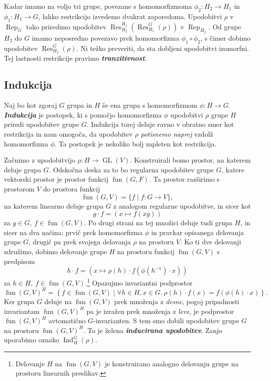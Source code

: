 \documentclass[11pt]{book}
\DeclareMathOperator\Res{Res}
\DeclareMathOperator\Ind{Ind}
\DeclareMathOperator\Rep{Rep}
\DeclareMathOperator\fun{fun}
\DeclareMathOperator\GL{GL}
\def\definicija{\color{rdeca}\bf\em}
\theoremstyle{definition}
\theoremstyle{zgled}
\theoremstyle{odprtproblem}
\theoremstyle{domacanaloga}
\theoremstyle{izrek}
\begin{document}
Kadar imamo na voljo tri grupe, povezane s homomorfizmoma $\phi_2 \colon H_2 \to H_1$ in $\phi_1 \colon H_1 \to G$, lahko restrikcijo izvedemo dvakrat zaporedoma. Upodobitvi $\rho$ v $\Rep_G$ tako priredimo upodobitev $\Res^{H_1}_{H_2}(\Res^G_{H_1}(\rho))$ v $\Rep_{H_2}$. Od grupe $H_2$ do $G$ imamo neposredno povezavo prek homomorfizma $\phi_1 \circ \phi_2$, s čimer dobimo upodobitev $\Res^G_{H_2}(\rho)$. Ni težko preveriti, da sta dobljeni upodobitvi izomorfni. Tej lastnosti restrikcije pravimo {\definicija tranzitivnost}.

\subsection{Indukcija}

Naj bo kot zgoraj $G$ grupa in $H$ še ena grupa s homomorfizmom $\phi \colon H \to G$. {\definicija Indukcija} je postopek, ki s pomočjo homomorfizma $\phi$ upodobitvi $\rho$ grupe $H$ priredi upodobitev grupe $G$. Indukcija torej deluje ravno v obratno smer kot restrikcija in nam omogoča, da upodobitev $\rho$ \emph{potisnemo naprej} vzdolž homomorfizma $\phi$. Ta postopek je nekoliko bolj zapleten kot restrikcija.

Začnimo z upodobitvijo $\rho \colon H \to \GL(V)$. Konstruirali bomo prostor, na katerem deluje grupa $G$. Odskočna deska za to bo regularna upodobitev grupe $G$, katere vektorski prostor je prostor funkcij $\fun(G,F)$. Ta prostor razširimo s prostorom $V$ do prostora funkcij
\[
    \fun(G,V) = \{ f \mid f \colon G \to V \},
\]
na katerem linearno deluje grupa $G$ z analogom regularne upodobitve, in sicer kot
\[
    g \cdot f = \left( x \mapsto f(xg) \right)
\]
za $g \in G, \ f \in \fun(G,V)$. Po drugi strani na tej množici deluje tudi grupa $H$, in sicer na dva načina: prvič prek homomorfizma $\phi$ in pravkar opisanega delovanja grupe $G$, drugič pa prek svojega delovanja $\rho$ na prostoru $V$. Ko ti dve delovanji združimo, dobimo delovanje grupe $H$ na prostoru funkcij
$\fun(G,V)$ s predpisom
\[
    h \cdot f = \left( x \mapsto \rho(h) \cdot f \left( \phi(h^{-1}) \cdot x \right) \right)
\]
za $h \in H, \ f \in \fun(G,V)$.\footnote{Delovanje $H$ na $\fun(G,V)$ je konstruirano analogno delovanju grupe na prostoru linearnih preslikav.} Opazujmo invariantni podprostor
\[
    \fun(G, V)^H =
    \left\{ f \in \fun(G,V) \mid \forall h \in H, x \in G. \ \rho(h) \cdot f(x) = f \left(\phi(h) \cdot x\right)\right\}.
\]
Ker grupa $G$ deluje na $\fun(G,V)$ prek množenja z \emph{desne}, pogoj pripadnosti invariantam $\fun(G,V)^H$ pa je izražen prek množenja z \emph{leve}, je podprostor $\fun(G,V)^H$ avtomatično $G$-invarianten. S tem smo dobili upodobitev grupe $G$ na prostoru $\fun(G,V)^H$. To je želena {\definicija inducirana upodobitev}. Zanjo uporabimo oznako $\Ind^G_H(\rho)$.
\end{document}
